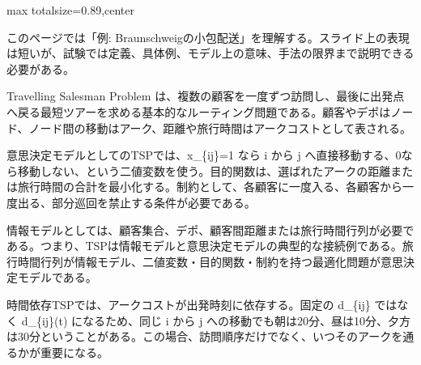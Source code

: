 \begin{minipage}[t]{0.58\textwidth}
\begin{adjustbox}{max totalsize={\textwidth}{0.89\textheight},center}
\begin{minipage}{\textwidth}\scriptsize
{}このページでは「例: Braunschweigの小包配送」を理解する。スライド上の表現は短いが、試験では定義、具体例、モデル上の意味、手法の限界まで説明できる必要がある。\par
Travelling Salesman Problem は、複数の顧客を一度ずつ訪問し、最後に出発点へ戻る最短ツアーを求める基本的なルーティング問題である。顧客やデポはノード、ノード間の移動はアーク、距離や旅行時間はアークコストとして表される。\par
意思決定モデルとしてのTSPでは、x\_\{ij\}=1 なら i から j へ直接移動する、0なら移動しない、という二値変数を使う。目的関数は、選ばれたアークの距離または旅行時間の合計を最小化する。制約として、各顧客に一度入る、各顧客から一度出る、部分巡回を禁止する条件が必要である。\par
情報モデルとしては、顧客集合、デポ、顧客間距離または旅行時間行列が必要である。つまり、TSPは情報モデルと意思決定モデルの典型的な接続例である。旅行時間行列が情報モデル、二値変数・目的関数・制約を持つ最適化問題が意思決定モデルである。\par
時間依存TSPでは、アークコストが出発時刻に依存する。固定の d\_\{ij\} ではなく d\_\{ij\}(t) になるため、同じ i から j への移動でも朝は20分、昼は10分、夕方は30分ということがある。この場合、訪問順序だけでなく、いつそのアークを通るかが重要になる。\par

\end{minipage}
\end{adjustbox}
\end{minipage}
